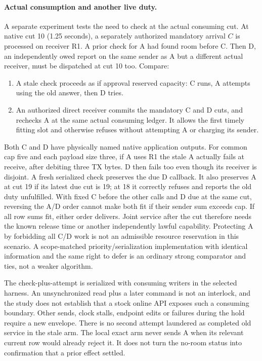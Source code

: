 \documentclass{article}
\begin{document}
\paragraph{Actual consumption and another live duty.}
A separate experiment tests the need to check at the actual
consuming cut. At native cut 10 (1.25 seconds), a separately
authorized mandatory arrival \(C\) is processed on receiver R1.
A prior check for A had found room before C. Then D, an
independently owed report on the same sender as A but a
different actual receiver, must be dispatched at cut 10 too.
Compare:
\begin{enumerate}
\item A stale check proceeds as if approval reserved capacity:
C runs, A attempts using the old answer, then D tries.
\item An authorized direct receiver commits the mandatory C and
D cuts, and rechecks A at the same actual consuming ledger.
It allows the first timely fitting slot and otherwise refuses
without attempting A or charging its sender.
\end{enumerate}
Both C and D have physically named native application outputs.
For common cap five and each payload size three, if A uses
R1 the stale A actually fails at receive, after debiting three
TX bytes. D then fails too even though its receiver is disjoint.
A fresh serialized check preserves the due D callback. It
also preserves A at cut 19 if its latest due cut is 19; at
18 it correctly refuses and reports the old duty unfulfilled.
With fixed C before the other calls and D due at the same
cut, reversing the A/D order cannot make both fit if their
sender sum exceeds cap. If all row sums fit, either order
delivers. Joint service after the cut therefore needs the
known release time or another independently lawful capability.
Protecting A by forbidding all C/D work is not an admissible
resource reservation in this scenario. A scope-matched
priority/serialization implementation with identical information
and the same right to defer is an ordinary strong comparator
and ties, not a weaker algorithm.

The check-plus-attempt is serialized with consuming writers
in the selected harness. An unsynchronized read plus a
later command is not an interlock, and the study does not
establish that a stock online API exposes such a consuming
boundary. Other sends, clock stalls, endpoint edits or failures
during the hold require a new envelope. There is no second
attempt laundered as completed old service in the stale arm.
The local exact arm never sends A when its relevant current
row would already reject it. It does not turn the no-room
status into confirmation that a prior effect settled.
\end{document}
